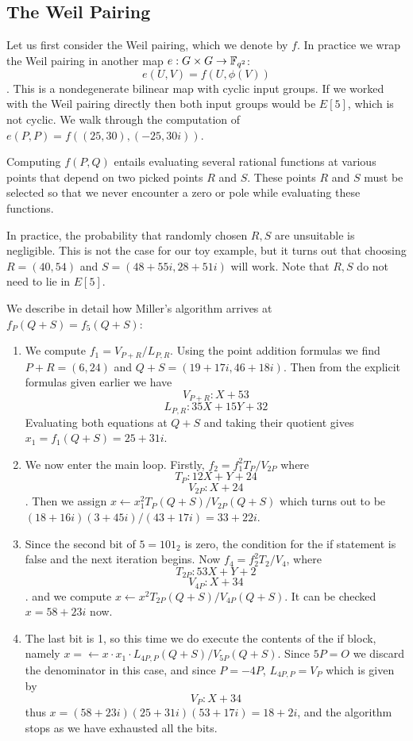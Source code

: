 \subsection {The Weil Pairing}

Let us first consider the Weil pairing, which we denote by $f$.
In practice we wrap the Weil pairing in another map
$e : G\times G \rightarrow \mathbb{F}_{q^2}$:
\[ e(U, V) = f(U, \phi(V)) \].
This is a nondegenerate bilinear map with cyclic input groups.
If we worked with the Weil pairing directly then both input groups would be
$E[5]$, which is not cyclic.
We walk through the computation of $e(P, P) = f((25,30), (-25,30i))$.

Computing $f(P, Q)$ entails evaluating several rational functions
at various points that depend on two picked points $R$ and $S$.
These points $R$ and $S$ must be selected so that we never encounter a
zero or pole while evaluating these functions.

In practice, the probability that randomly chosen $R, S$ are unsuitable
is negligible. This is not the case for our toy example, but it turns
out that choosing $R = (40,54)$ and $S = (48+55i,28+51i)$
will work. Note that $R, S$ do not need to lie in $E[5]$.

We describe in detail how Miller's algorithm arrives at $f_P(Q+S) = f_5(Q+S)$:
\begin{enumerate}
\item
We compute $f_1 = V_{P+R} / L_{P,R}$.
Using the point addition formulas we find $P+R = (6,24)$
and $Q+S=(19+17i, 46+18i)$.
Then
from the explicit formulas given earlier we have
\[ V_{P+R} : X + 53 \]
\[ L_{P,R} : 35 X + 15 Y + 32 \]
Evaluating both equations at $Q + S$ and taking their quotient
gives $x_1 = f_1(Q+S) = 25 + 31i$.
\item
We now enter the main loop.
Firstly, $f_2 = f_1^2 T_{P} / V_{2P}$ where
\[ T_{P} : 12 X + Y + 24 \]
\[ V_{2P} : X + 24 \].
Then we assign $x \leftarrow x_1^2 T_{P}(Q+S) / V_{2P}(Q+S)$
which turns out to be $(18 + 16i)(3+45i)/(43+17i) = 33 + 22i$.
\item
Since the second bit of $5 = 101_2$ is zero, the condition for the if statement
is false and the next iteration begins. Now
$f_4 = f_2^2 T_2 / V_4$, where
\[ T_{2P} : 53 X + Y + 2 \]
\[ V_{4P} : X + 34 \].
and we compute $x \leftarrow x^2 T_{2P}(Q+S) / V_{4P}(Q+S)$.
It can be checked $x = 58 + 23i$ now.
\item
The last bit is 1, so this time we do execute the contents of the if block,
namely $x=\leftarrow x \cdot x_1 \cdot L_{4P,P}(Q+S)/V_{5P}(Q+S)$.
Since $5P = O$ we discard the denominator in this case, and since $P = -4P$,
$L_{4P, P} = V_P$ which is given by
\[ V_P : X + 34 \] thus $x = (58+23i)(25+31i)(53+17i) = 18 + 2i$,
and the algorithm stops as we have exhausted all the bits.
\end{enumerate}

